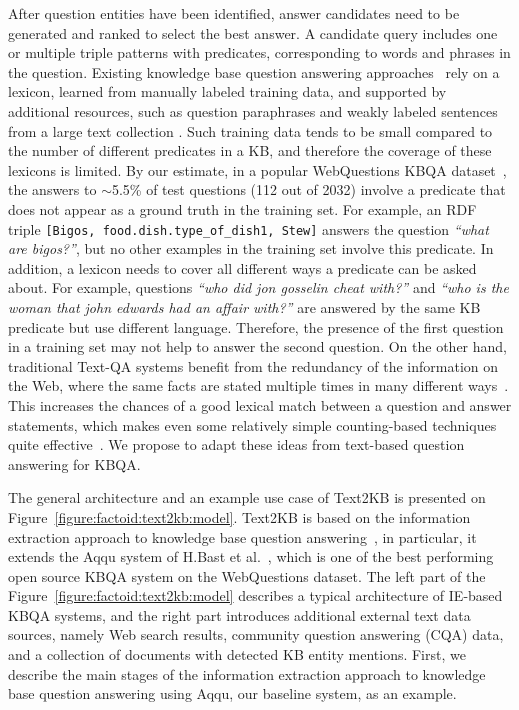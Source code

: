 After question entities have been identified, answer candidates need to be generated and ranked to select the best answer.
A candidate query includes one or multiple triple patterns with predicates, corresponding to words and phrases in the question.
Existing knowledge base question answering approaches~\cite{bastmore:cikm:2015:aquu,BerantCFL13:sempre,BerantL14:parasempre,berant2015imitation,BordesCW14:emnlp,yao2014freebase} rely on a lexicon, learned from manually labeled training data, and supported by additional resources, such as question paraphrases \cite{BerantL14:parasempre} and weakly labeled sentences from a large text collection \cite{YaoD14}.
Such training data tends to be small compared to the number of different predicates in a KB, and therefore the coverage of these lexicons is limited.
By our estimate, in a popular WebQuestions KBQA dataset~\cite{BerantCFL13:sempre}, the answers to $\sim$5.5\% of test questions (112 out of 2032) involve a predicate that does not appear as a ground truth in the training set.
For example, an RDF triple \texttt{[Bigos, food.dish.type\_of\_dish1, Stew]} answers the question \textit{``what are bigos?''}, but no other examples in the training set involve this predicate.
In addition, a lexicon needs to cover all different ways a predicate can be asked about.
For example, questions \textit{``who did jon gosselin cheat with?''} and \textit{``who is the woman that john edwards had an affair with?''} are answered by the same KB predicate but use different language.
Therefore, the presence of the first question in a training set may not help to answer the second question.
On the other hand, traditional Text-QA systems benefit from the redundancy of the information on the Web, where the same facts are stated multiple times in many different ways~\cite{lin2007exploration}.
This increases the chances of a good lexical match between a question and answer statements, which makes even some relatively simple counting-based techniques quite effective~\cite{brill2002analysis}.
We propose to adapt these ideas from text-based question answering for KBQA.

The general architecture and an example use case of Text2KB is presented on Figure~\ref{figure:factoid:text2kb:model}.
Text2KB is based on the information extraction approach to knowledge base question answering~\cite{YaoD14}, in particular, it extends the Aqqu system of H.Bast et al.~\cite{bastmore:cikm:2015:aquu}, which is one of the best performing open source KBQA system on the WebQuestions dataset.
The left part of the Figure~\ref{figure:factoid:text2kb:model} describes a typical architecture of IE-based KBQA systems, and the right part introduces additional external text data sources, namely Web search results, community question answering (CQA) data, and a collection of documents with detected KB entity mentions.
First, we describe the main stages of the information extraction approach to knowledge base question answering using Aqqu, our baseline system, as an example.

